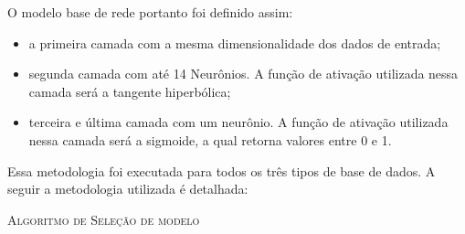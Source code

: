  O modelo base de rede portanto foi definido assim:
 
 \begin{itemize}
     \item a primeira camada com a mesma dimensionalidade dos dados de entrada;
     \item segunda camada com até 14 Neurônios. A função de ativação utilizada nessa camada será a tangente hiperbólica;
     \item terceira e última camada com um neurônio. A função de ativação utilizada nessa camada será a sigmoide, a qual retorna valores entre 0 e 1.
 \end{itemize}
 

Essa metodologia foi executada para todos os três tipos de base de dados. A seguir a metodologia utilizada é detalhada:
 
 \begin{algorithm}[H]
   \SetAlgoLined
    
  
   \Retorna{$\Theta$}
   \label{alg:selecao_modelo}
   \caption{\textsc{Algoritmo de Seleção de modelo }}
 \end{algorithm}
 
